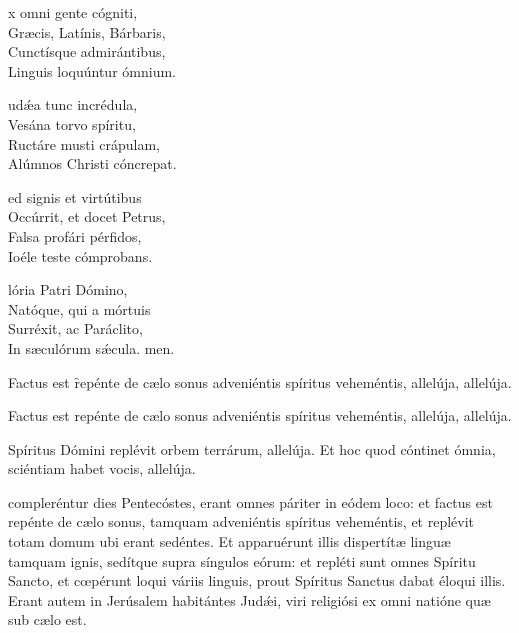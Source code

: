 \documentclass[fontsize=9pt,paper=A6,twoside,BCOR=1mm,DIV=22,headinclude]{scrarticle}
\begin{document}
\begin{multicols}{2}
{\begin{hymnus}
x omni gente cógniti,\\
Græcis, Latínis, Bárbaris,\\
Cunctísque admirántibus,\\
Linguis loquúntur ómnium.

udǽa tunc incrédula,\\
Vesána torvo spíritu,\\
Ructáre musti crápulam,\\
Alúmnos Christi cóncrepat.

ed signis et virtútibus\\
Occúrrit, et docet Petrus,\\
Falsa profári pérfidos,\\
Ioéle teste cómprobans.

lória Patri Dómino,\\
Natóque, qui a mórtuis\\
Surréxit, ac Paráclito,\\
In sæculórum sǽcula.
men.
\end{hymnus}


\A Factus est \f repénte de cælo sonus adveniéntis spíritus veheméntis, allelúja, allelúja.
}













\A Factus est repénte de cælo sonus adveniéntis spíritus veheméntis, allelúja, allelúja.

\V Spíritus Dómini replévit orbem terrárum, allelúja.
\R Et hoc quod cóntinet ómnia, sciéntiam habet vocis, allelúja.

 compleréntur dies Pentecóstes, erant omnes páriter in eódem loco: et factus est repénte de cælo sonus, tamquam adveniéntis spíritus veheméntis, et replévit totam domum ubi erant sedéntes. Et apparuérunt illis dispertítæ linguæ tamquam ignis, sedítque supra síngulos eórum: et repléti sunt omnes Spíritu Sancto, et cœpérunt loqui váriis linguis, prout Spíritus Sanctus dabat éloqui illis. Erant autem in Jerúsalem habitántes Judǽi, viri religiósi ex omni natióne quæ sub cælo est.


\end{multicols}
\end{document}
